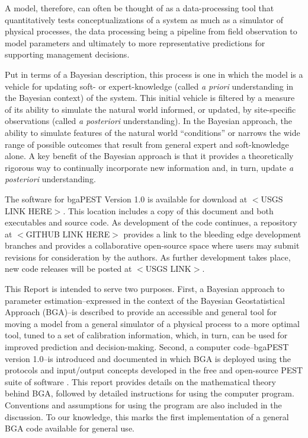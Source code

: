 \documentclass[11pt,oneside,onecolumn]{usgsreport}
\begin{document}
\begin{multicols}{2}
\begin{bibunit}
A model, therefore, can often be thought of as a data-processing tool
that quantitatively tests conceptualizations of a system as much as
a simulator of physical processes, the data processing being a pipeline
from field observation to model parameters and ultimately to more
representative predictions for supporting management decisions. 

Put in terms of a Bayesian description, this process is one in which
the model is a vehicle for updating soft- or expert-knowledge (called
\emph{a priori} understanding in the Bayesian context) of the system.
This initial vehicle is filtered by a measure of its ability to simulate
the natural world informed, or updated, by site-specific observations
(called \emph{a posteriori} understanding). In the Bayesian approach,
the ability to simulate features of the natural world ``conditions''
or narrows the wide range of possible outcomes that result from general
expert and soft-knowledge alone. A key benefit of the Bayesian approach
is that it provides a theoretically rigorous way to continually incorporate
new information and, in turn, update \emph{a posteriori} understanding.




The software for bgaPEST Version 1.0 is available for download at
$<$USGS LINK HERE$>$. This location includes a copy of this document and
both executables and source code. As development of the code continues,
a repository at $<$GITHUB LINK HERE$>$ provides a link to the bleeding
edge development branches and provides a collaborative open-source
space where users may submit revisions for consideration by the authors.
As further development takes place, new code releases will be posted
at $<$USGS LINK$>$. 



This Report is intended to serve two purposes. First, a Bayesian approach
to parameter estimation--expressed in the context of the Bayesian
Geostatistical Approach (BGA)--is described to provide an accessible
and general tool for moving a model from a general simulator of a
physical process to a more optimal tool, tuned to a set of calibration
information, which, in turn, can be used for improved prediction and
decision-making. Second, a computer code--bgaPEST version 1.0--is
introduced and documented in which BGA is deployed using the protocols
and input/output concepts developed in the free and open-source PEST
suite of software \citet{PEST}. This report provides details on the
mathematical theory behind BGA, followed by detailed instructions
for using the computer program. Conventions and assumptions for using
the program are also included in the discussion. To our knowledge,
this marks the first implementation of a general BGA code available
for general use. 


\end{bibunit}
\end{multicols}
\end{document}
